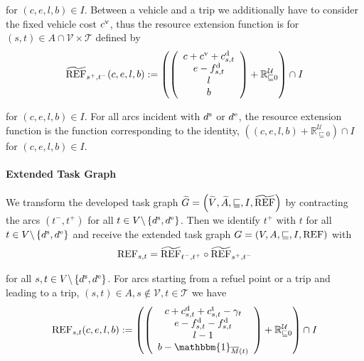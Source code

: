 for $(c,e,l,b)\in I$. Between a vehicle and a trip we additionally have to consider the fixed vehicle cost $c^{\operatorname{v}}$, thus the resource extension function is for ${(s,t)\in A\cap\mathcal{V}\times\mathcal{T}}$ defined by
\begin{align*}
	\widetilde{\operatorname{REF}}_{s^+,t^-}(c,e,l,b) := \left(\left(
	\begin{array}{c}
		c + c^{\operatorname{v}} + c^{\operatorname{d}}_{s,t} \\ e-f^{\operatorname{d}}_{s,t} \\ l \\ b
	\end{array}
	\right) + \mathbb{R}^{\mathcal{U}}_{\sqsubseteq 0}\right) \cap I
\end{align*}

for $(c,e,l,b)\in I$. For all arcs incident with $d^{\operatorname{s}}$ or $d^{\operatorname{e}}$, the resource extension function is the function corresponding to the identity, \ie ${\left((c,e,l,b)+\mathbb{R}^{\mathcal{U}}_{\sqsubseteq 0}\right)\cap I}$ for ${(c,e,l,b)\in I}$.

\paragraph{Extended Task Graph} \parfill

We transform the developed task graph ${\widetilde{G}=\left(\widetilde{V},\widetilde{A},\sqsubseteq,I,\widetilde{\operatorname{REF}}\right)}$ by contracting the arcs $\left(t^-,t^+\right)$ for all $t\in V\backslash\left\{d^{\operatorname{s}},d^{\operatorname{e}}\right\}$. Then we identify $t^+$ with $t$ for all $t\in V\backslash\left\{d^{\operatorname{s}},d^{\operatorname{e}}\right\}$ and receive the extended task graph ${G=\left(V,A,\sqsubseteq,I,\operatorname{REF}\right)}$ with
\begin{align*}
	\operatorname{REF}_{s,t} = \widetilde{\operatorname{REF}}_{t^-,t^+}\circ\widetilde{\operatorname{REF}}_{s^+,t^-}
\end{align*}

for all $s,t\in V\backslash\left\{d^{\operatorname{s}},d^{\operatorname{e}}\right\}$. For arcs starting from a refuel point or a trip and leading to a trip, \ie ${(s,t)\in A,s\notin\mathcal{V},t\in\mathcal{T}}$ we have
\begin{align*}
	\REF_{s,t}(c,e,l,b) := \left(\left(
	\begin{array}{c}
		c + \cd_{s,t} + \ct_{s,t} - \gamma_t \\ e - \fd_{s,t} - \fd_{s,t} \\ l - 1 \\ b - \mathbbm{1}_{\overline{M}(t)}
	\end{array}
	\right) + \mathbb{R}^{\mathcal{U}}_{\sqsubseteq 0}\right) \cap I
\end{align*}

